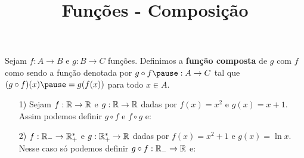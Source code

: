 \documentclass{beamer}
\title{Fun\c{c}\~oes - Composição}
\author[\autor]{\autor}
\institute[\instituto]{\instituto}
\date{}
\begin{document}
    \begin{frame}
        \maketitle
    \end{frame}


    \begin{frame}
        \begin{definicao}
            Sejam $f : A \to B$ \pause e $g : B \to C$ \pause fun\c{c}\~oes. \pause Definimos a \textbf{fun\c{c}\~ao composta} \pause de $g$ com $f$ \pause como sendo a fun\c{c}\~ao denotada por $g \circ f \pause : A \to C$ \pause tal que \pause $(g\circ f)(x) \pause = g(f(x))$ \pause para todo $x \in A$.\pause
        \end{definicao}

        \vspace{5cm}
    \end{frame}

    \begin{frame}
        \begin{exemplos}
            \begin{enumerate}
                \item[1)] Sejam $f : \mathbb{R} \to \mathbb{R}$ \pause e $g : \mathbb{R} \to \mathbb{R}$ \pause dadas por $f(x) = x^2$ \pause e $g(x) = x + 1$. \pause Assim podemos definir $g \circ f$ \pause e $f \circ g$ e:\pause
            \end{enumerate}
        \end{exemplos}

        \vspace{5cm}
    \end{frame}

    \begin{frame}
        \vspace{5cm}
    \end{frame}

    \begin{frame}
        \begin{exemplos}
            \begin{enumerate}
                \item[2)] $f : \mathbb{R}_- \to \mathbb{R}^*_+$ \pause e $g : \mathbb{R}^*_+ \to \mathbb{R}$ \pause dadas por $f(x) = x^2 + 1$ \pause e $g(x) = \ln x$. \pause Nesse caso s\'o podemos definir $g \circ f : \mathbb{R}_- \to \mathbb{R}$ e:\pause
            \end{enumerate}
        \end{exemplos}

        \vspace{5cm}
    \end{frame}
\end{document}
